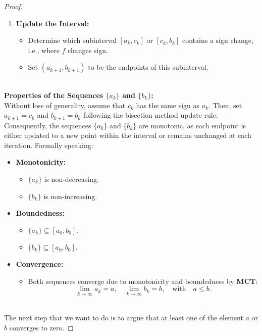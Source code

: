 \documentclass{article}
\begin{document}
\begin{proof}
\begin{enumerate}
        \item \textbf{Update the Interval:}
        \begin{itemize}
            \item Determine which subinterval \( [a_k, c_k] \) or \( [c_k, b_k] \) contains a sign change, i.e., where \( f \) changes sign.
            \item Set \( (a_{k+1}, b_{k+1}) \) to be the endpoints of this subinterval.
        \end{itemize}
    \end{enumerate}
    \\
    \textbf{Properties of the Sequences \( \{a_k\} \) and \( \{b_k\} \):}
    \\
    Without loss of generality, assume that \( c_k \) has the same sign as \( a_k \). Then, set \( a_{k+1} = c_k \) and \( b_{k+1} = b_k \) following the bisection method update rule. 
    Consequently, the sequences \( \{a_k\} \) and \( \{b_k\} \) are monotonic, as each endpoint is either updated to a new point within the interval or remains unchanged at each iteration.
    Formally speaking: 
    \begin{itemize}
        \item \textbf{Monotonicity:}
        \begin{itemize}
            \item \( \{a_k\} \) is non-decreasing.
            \item \( \{b_k\} \) is non-increasing.
        \end{itemize}
        \item \textbf{Boundedness:}
        \begin{itemize}
            \item \( \{a_k\} \subseteq [a_0, b_0] \).
            \item \( \{b_k\} \subseteq [a_0, b_0] \).
        \end{itemize}
        \item \textbf{Convergence:}
        \begin{itemize}
            \item Both sequences converge due to monotonicity and boundedness by \textbf{MCT}:
            \[
                \lim_{k \to \infty} a_k = a, \quad \lim_{k \to \infty} b_k = b, \quad \text{with} \quad a \leq b.
            \]
        \end{itemize}
    \end{itemize}
    \\
    The next step that we want to do is to argue that at least one of the element $a$ or $b$ converges to zero.

\end{proof}
\end{document}
